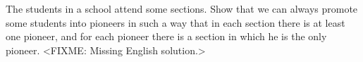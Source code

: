 \problem{}
The students in a school attend some sections.
Show that we can always promote some students into pioneers in such a way that
in each section there is at least one pioneer, and for each pioneer there is a
section in which he is the only pioneer.
\solution
<FIXME: Missing English solution.>
\endproblem
